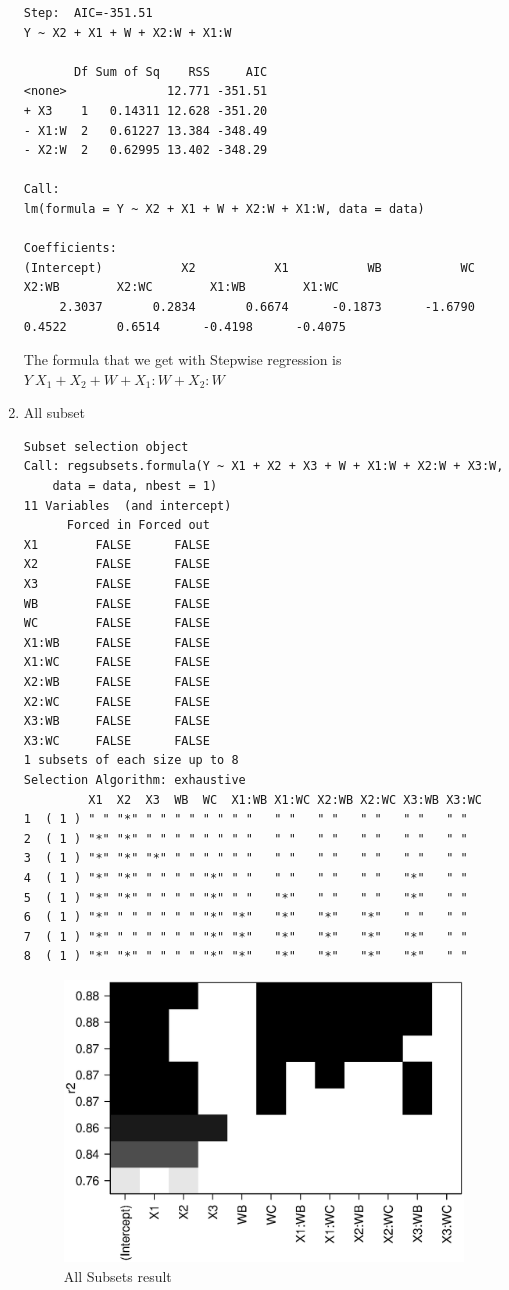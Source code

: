 \documentclass{article}
\begin{document}
\begin{enumerate}
\begin{lstlisting}
Step:  AIC=-351.51
Y ~ X2 + X1 + W + X2:W + X1:W

       Df Sum of Sq    RSS     AIC
<none>              12.771 -351.51
+ X3    1   0.14311 12.628 -351.20
- X1:W  2   0.61227 13.384 -348.49
- X2:W  2   0.62995 13.402 -348.29

Call:
lm(formula = Y ~ X2 + X1 + W + X2:W + X1:W, data = data)

Coefficients:
(Intercept)           X2           X1           WB           WC        X2:WB        X2:WC        X1:WB        X1:WC  
     2.3037       0.2834       0.6674      -0.1873      -1.6790       0.4522       0.6514      -0.4198      -0.4075  
  \end{lstlisting}
  The formula that we get with Stepwise regression is $Y ~ X_1 + X_2 + W +
  X_1:W + X_2:W$
  
  \item All subset
  \begin{lstlisting}
Subset selection object
Call: regsubsets.formula(Y ~ X1 + X2 + X3 + W + X1:W + X2:W + X3:W, 
    data = data, nbest = 1)
11 Variables  (and intercept)
      Forced in Forced out
X1        FALSE      FALSE
X2        FALSE      FALSE
X3        FALSE      FALSE
WB        FALSE      FALSE
WC        FALSE      FALSE
X1:WB     FALSE      FALSE
X1:WC     FALSE      FALSE
X2:WB     FALSE      FALSE
X2:WC     FALSE      FALSE
X3:WB     FALSE      FALSE
X3:WC     FALSE      FALSE
1 subsets of each size up to 8
Selection Algorithm: exhaustive
         X1  X2  X3  WB  WC  X1:WB X1:WC X2:WB X2:WC X3:WB X3:WC
1  ( 1 ) " " "*" " " " " " " " "   " "   " "   " "   " "   " "  
2  ( 1 ) "*" "*" " " " " " " " "   " "   " "   " "   " "   " "  
3  ( 1 ) "*" "*" "*" " " " " " "   " "   " "   " "   " "   " "  
4  ( 1 ) "*" "*" " " " " "*" " "   " "   " "   " "   "*"   " "  
5  ( 1 ) "*" "*" " " " " "*" " "   "*"   " "   " "   "*"   " "  
6  ( 1 ) "*" " " " " " " "*" "*"   "*"   "*"   "*"   " "   " "  
7  ( 1 ) "*" " " " " " " "*" "*"   "*"   "*"   "*"   "*"   " "  
8  ( 1 ) "*" "*" " " " " "*" "*"   "*"   "*"   "*"   "*"   " "  
  \end{lstlisting}
  \begin{figure}[H]
  \centering
  \includegraphics[scale=0.6]{allsubsets.eps}
  \caption{All Subsets result}
  \label{fig:allsubsets}
  \end{figure}
\end{enumerate}
\end{document}
